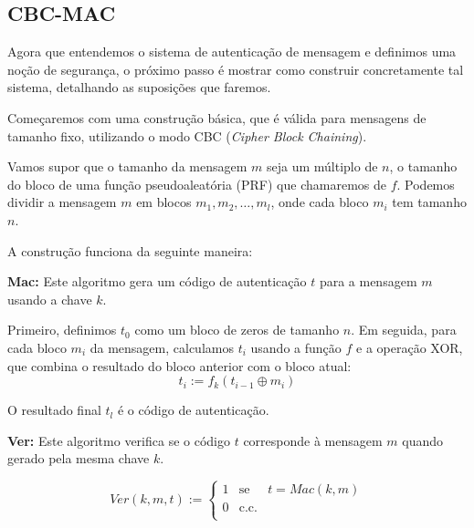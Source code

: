 \subsection{CBC-MAC}
\label{sec:cbc-mac}

Agora que entendemos o sistema de autenticação de mensagem e definimos uma noção de segurança, o próximo passo é mostrar como construir concretamente tal sistema, detalhando as suposições que faremos.

Começaremos com uma construção básica, que é válida para mensagens de tamanho fixo, utilizando o modo CBC ({\em Cipher Block Chaining}).

Vamos supor que o tamanho da mensagem $m$ seja um múltiplo de $n$, o tamanho do bloco de uma função pseudoaleatória (PRF) que chamaremos de $f$.
Podemos dividir a mensagem $m$ em blocos $m_1, m_2, \dots, m_l$, onde cada bloco $m_i$ tem tamanho $n$.

A construção funciona da seguinte maneira:

\textbf{Mac:} Este algoritmo gera um código de autenticação $t$ para a mensagem $m$ usando a chave $k$.

Primeiro, definimos $t_0$ como um bloco de zeros de tamanho $n$.
Em seguida, para cada bloco $m_i$ da mensagem, calculamos $t_i$ usando a função $f$ e a operação XOR, que combina o resultado do bloco anterior com o bloco atual:
\begin{displaymath}
t_i := f_k(t_{i-1} \oplus m_i)
\end{displaymath}

O resultado final $t_l$ é o código de autenticação.

\textbf{Ver:} Este algoritmo verifica se o código $t$ corresponde à mensagem $m$ quando gerado pela mesma chave $k$.

\begin{displaymath}
  Ver(k, m, t) :=  \left\{
  \begin{array}{lcl}
    1 & \textrm{se} & t = Mac(k,m)\\
    0 & \textrm{c.c.} &\\
  \end{array}
  \right.
\end{displaymath}


\begin{center}
\end{center}


